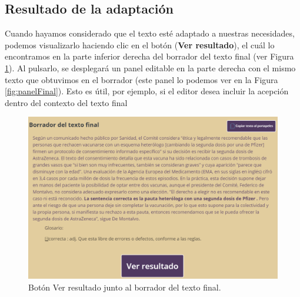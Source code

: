 \subsection{Resultado de la adaptación}
 
Cuando hayamos considerado que el texto esté adaptado a nuestras necesidades, podemos visualizarlo haciendo clic en el botón (\textbf{Ver resultado}), el cuál lo encontramos en la parte inferior derecha del borrador del texto final (ver Figura \ref{fig:botonResultado}). Al pulsarlo, se desplegará un panel editable en la parte derecha con el mismo texto que obtuvimos en el borrador (este panel lo podemos ver en la Figura \ref{fig:panelFinal}). Esto es útil, por ejemplo, si el editor desea incluir la acepción dentro del contexto del texto final 
\begin{figure}[h!]
	\centering
	
	
	\includegraphics[scale=0.8]{Imagenes/Figuras/verResultado}
	
	
	\caption{Botón Ver resultado junto al borrador del texto final.}
	\label{fig:botonResultado}
\end{figure}
